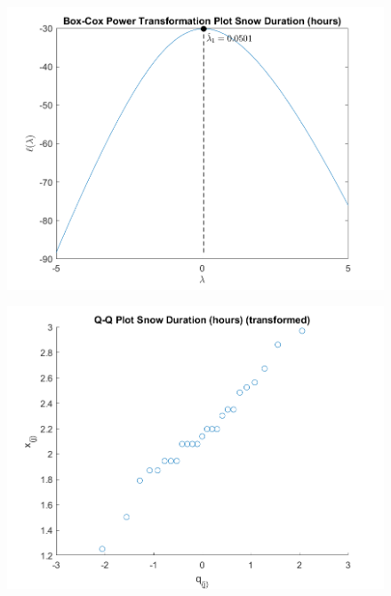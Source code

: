 \begin{enumerate}[label= (\alph*)]
    \begin{center}
        \begin{figure}[H]
            \centering
            \includegraphics[scale=0.4]{./matlab/chapter-4/sol4.41.power.1.png}
        \end{figure}
    \end{center}
    
    \begin{center}
        \begin{figure}[H]
            \centering
            \includegraphics[scale=0.4]{./matlab/chapter-4/sol4.41.qq.tr.1.png}
        \end{figure}
    \end{center}


\end{enumerate}
